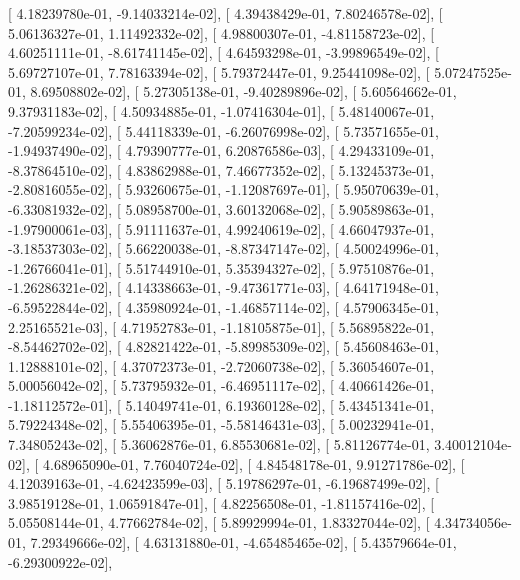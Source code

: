 \documentclass{article}
\begin{document}
       [  4.18239780e-01,  -9.14033214e-02],
       [  4.39438429e-01,   7.80246578e-02],
       [  5.06136327e-01,   1.11492332e-02],
       [  4.98800307e-01,  -4.81158723e-02],
       [  4.60251111e-01,  -8.61741145e-02],
       [  4.64593298e-01,  -3.99896549e-02],
       [  5.69727107e-01,   7.78163394e-02],
       [  5.79372447e-01,   9.25441098e-02],
       [  5.07247525e-01,   8.69508802e-02],
       [  5.27305138e-01,  -9.40289896e-02],
       [  5.60564662e-01,   9.37931183e-02],
       [  4.50934885e-01,  -1.07416304e-01],
       [  5.48140067e-01,  -7.20599234e-02],
       [  5.44118339e-01,  -6.26076998e-02],
       [  5.73571655e-01,  -1.94937490e-02],
       [  4.79390777e-01,   6.20876586e-03],
       [  4.29433109e-01,  -8.37864510e-02],
       [  4.83862988e-01,   7.46677352e-02],
       [  5.13245373e-01,  -2.80816055e-02],
       [  5.93260675e-01,  -1.12087697e-01],
       [  5.95070639e-01,  -6.33081932e-02],
       [  5.08958700e-01,   3.60132068e-02],
       [  5.90589863e-01,  -1.97900061e-03],
       [  5.91111637e-01,   4.99240619e-02],
       [  4.66047937e-01,  -3.18537303e-02],
       [  5.66220038e-01,  -8.87347147e-02],
       [  4.50024996e-01,  -1.26766041e-01],
       [  5.51744910e-01,   5.35394327e-02],
       [  5.97510876e-01,  -1.26286321e-02],
       [  4.14338663e-01,  -9.47361771e-03],
       [  4.64171948e-01,  -6.59522844e-02],
       [  4.35980924e-01,  -1.46857114e-02],
       [  4.57906345e-01,   2.25165521e-03],
       [  4.71952783e-01,  -1.18105875e-01],
       [  5.56895822e-01,  -8.54462702e-02],
       [  4.82821422e-01,  -5.89985309e-02],
       [  5.45608463e-01,   1.12888101e-02],
       [  4.37072373e-01,  -2.72060738e-02],
       [  5.36054607e-01,   5.00056042e-02],
       [  5.73795932e-01,  -6.46951117e-02],
       [  4.40661426e-01,  -1.18112572e-01],
       [  5.14049741e-01,   6.19360128e-02],
       [  5.43451341e-01,   5.79224348e-02],
       [  5.55406395e-01,  -5.58146431e-03],
       [  5.00232941e-01,   7.34805243e-02],
       [  5.36062876e-01,   6.85530681e-02],
       [  5.81126774e-01,   3.40012104e-02],
       [  4.68965090e-01,   7.76040724e-02],
       [  4.84548178e-01,   9.91271786e-02],
       [  4.12039163e-01,  -4.62423599e-03],
       [  5.19786297e-01,  -6.19687499e-02],
       [  3.98519128e-01,   1.06591847e-01],
       [  4.82256508e-01,  -1.81157416e-02],
       [  5.05508144e-01,   4.77662784e-02],
       [  5.89929994e-01,   1.83327044e-02],
       [  4.34734056e-01,   7.29349666e-02],
       [  4.63131880e-01,  -4.65485465e-02],
       [  5.43579664e-01,  -6.29300922e-02],
\end{document}
